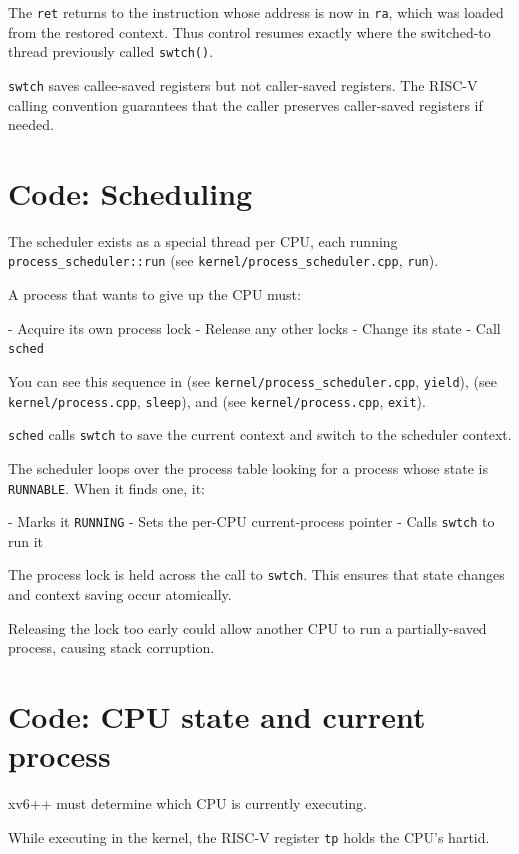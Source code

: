 The \texttt{ret} returns to the instruction whose address is now in
\texttt{ra}, which was loaded from the restored context.
Thus control resumes exactly where the switched-to thread
previously called \texttt{swtch()}.

\texttt{swtch} saves callee-saved registers but not caller-saved registers.
The RISC-V calling convention guarantees that the caller preserves
caller-saved registers if needed.

\section{Code: Scheduling}

The scheduler exists as a special thread per CPU, each running
\texttt{process\_scheduler::run}
(see \texttt{kernel/process\_scheduler.cpp}, \texttt{run}).

A process that wants to give up the CPU must:

- Acquire its own process lock  
- Release any other locks  
- Change its state  
- Call \texttt{sched}  

You can see this sequence in
(see \texttt{kernel/process\_scheduler.cpp}, \texttt{yield}),
(see \texttt{kernel/process.cpp}, \texttt{sleep}),
and
(see \texttt{kernel/process.cpp}, \texttt{exit}).

\texttt{sched} calls \texttt{swtch} to save the current context and
switch to the scheduler context.

The scheduler loops over the process table
looking for a process whose state is \lstinline{RUNNABLE}.
When it finds one, it:

- Marks it \lstinline{RUNNING}
- Sets the per-CPU current-process pointer
- Calls \texttt{swtch} to run it

The process lock is held across the call to \texttt{swtch}.
This ensures that state changes and context saving occur atomically.

Releasing the lock too early could allow another CPU
to run a partially-saved process, causing stack corruption.

\section{Code: CPU state and current process}

xv6++ must determine which CPU is currently executing.

While executing in the kernel, the RISC-V register
\lstinline{tp}
holds the CPU's hartid.


